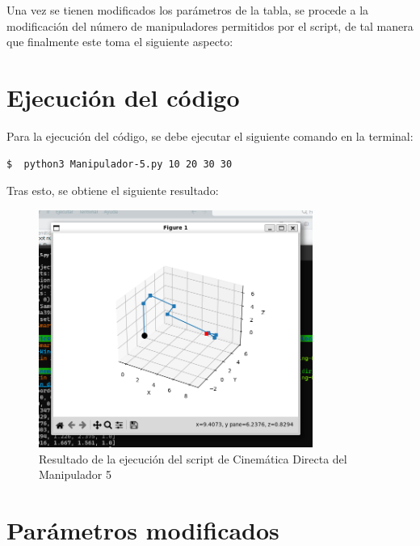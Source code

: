 \documentclass[11pt]{report}
\begin{document}
Una vez se tienen modificados los parámetros de la tabla, se procede a la modificación del número de manipuladores permitidos por el script, de tal manera que finalmente este toma el siguiente aspecto:



\section{Ejecución del código}

Para la ejecución del código, se debe ejecutar el siguiente comando en la terminal:

\begin{lstlisting}[style=bash, caption={Ejecución del script de Cinemática Directa del Manipulador 5}, label=bash]
  $  python3 Manipulador-5.py 10 20 30 30
\end{lstlisting}

Tras esto, se obtiene el siguiente resultado:

\begin{figure}[H]
    \centering
    \includegraphics[width=0.8\textwidth]{src/img/Manipulador-5-resultado.png}
    \caption{Resultado de la ejecución del script de Cinemática Directa del Manipulador 5}
    \label{fig:robot5-result}
\end{figure}

\section{Parámetros modificados}
\end{document}
